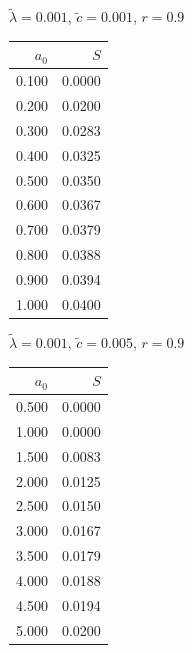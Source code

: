 \documentclass[11pt,a4paper]{article}
\begin{document}
\begin{minipage}[t]{\textwidth}
    \begin{minipage}[t]{0.32\textwidth}
        \footnotesize
        \begin{flushleft}$\tilde{\lambda}=0.001$, $\tilde{c}=0.001$, $r=0.9$\end{flushleft}
        \begin{tabular}[t]{rr}
            $a_0$ & $S$ \\
            \hline
             0.100 & 0.0000 \\
             0.200 & 0.0200 \\
             0.300 & 0.0283 \\
             0.400 & 0.0325 \\
             0.500 & 0.0350 \\
             0.600 & 0.0367 \\
             0.700 & 0.0379 \\
             0.800 & 0.0388 \\
             0.900 & 0.0394 \\
             1.000 & 0.0400 \\
        \end{tabular}
    \end{minipage}
    \begin{minipage}[t]{0.32\textwidth}
        \footnotesize
        \begin{flushleft}$\tilde{\lambda}=0.001$, $\tilde{c}=0.005$, $r=0.9$\end{flushleft}
        \begin{tabular}[t]{rr}
            $a_0$ & $S$ \\
            \hline
             0.500 & 0.0000 \\
             1.000 & 0.0000 \\
             1.500 & 0.0083 \\
             2.000 & 0.0125 \\
             2.500 & 0.0150 \\
             3.000 & 0.0167 \\
             3.500 & 0.0179 \\
             4.000 & 0.0188 \\
             4.500 & 0.0194 \\
             5.000 & 0.0200 \\
        \end{tabular}
    \end{minipage}
    \begin{minipage}[t]{0.32\textwidth}

\end{minipage}
\end{minipage}
\end{document}
